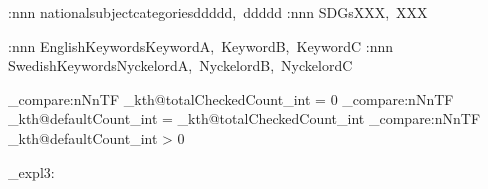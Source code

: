 {    \kth@check@value:nnn {nationalsubjectcategories}{\@nationalsubjectcategories}{ddddd,~ddddd}
    \kth@check@value:nnn {SDGs}{\@SDGs}{XXX,~XXX}

    \kth@check@value:nnn {EnglishKeywords}{\@EnglishKeywords}{KeywordA,~KeywordB,~KeywordC}
    \kth@check@value:nnn {SwedishKeywords}{\@SwedishKeywords}{NyckelordA,~NyckelordB,~NyckelordC}

    
    \int_compare:nNnTF { \g_kth@totalCheckedCount_int } = { 0 }
    { %
    }
    { %
        \int_compare:nNnTF { \g_kth@defaultCount_int } = { \g_kth@totalCheckedCount_int } %
        { %
        }
        { %
            \int_compare:nNnTF { \g_kth@defaultCount_int } > { 0 } %
            { %
            }
            { %
            }
        }
    }
    \checknationalsubjectcategories{}
}
\ExplSyntaxOff %

\ExplSyntaxOn
\NewDocumentCommand{\kthPerformSanityCheck}{}
{%
    \kth@perform@sanity@check_expl3: %
}
\ExplSyntaxOff %
\makeatother


\AtEndDocument{\kthPerformSanityCheck}
